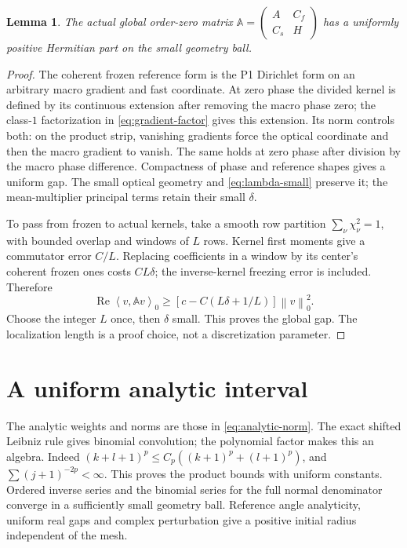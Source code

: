 \documentclass[11pt,a4paper]{article}
\numberwithin{equation}{section}
\newtheorem{lemma}[theorem]{Lemma}
\theoremstyle{remark}
\newcommand{\norm}[1]{\left\lVert #1\right\rVert}
\newcommand{\ip}[2]{\left\langle #1,#2\right\rangle_0}
\begin{document}
\begin{lemma}\label{lem:global-gap}
The actual global order-zero matrix
\(\mathbb A=\left(\begin{smallmatrix}A&C_f\\C_s&H\end{smallmatrix}\right)\)
has a uniformly positive Hermitian part on the small geometry ball.
\end{lemma}
\begin{proof}
The coherent frozen reference form is the P1 Dirichlet form on an
arbitrary macro gradient and fast coordinate. At zero phase the divided
kernel is defined by its continuous extension after removing the macro
phase zero; the class-\(1\) factorization in
\eqref{eq:gradient-factor} gives this extension. Its norm controls both:
on the product strip, vanishing gradients force the optical
coordinate and then the macro gradient to vanish. The same holds
at zero phase after division by the macro phase difference.
Compactness of phase and reference shapes gives a uniform gap.
The small optical geometry and \eqref{eq:lambda-small} preserve it;
the mean-multiplier principal terms retain their small \(\delta\).

To pass from frozen to actual kernels, take a smooth row partition
\(\sum_\nu\chi_\nu^2=1\), with bounded overlap and windows of \(L\)
rows. Kernel first moments give a commutator error \(C/L\).
Replacing coefficients in a window by its center's coherent frozen
ones costs \(CL\delta\); the inverse-kernel freezing error is
included. Therefore
\[
 \operatorname{Re}\ip v{\mathbb Av}
       \geq [c-C(L\delta+1/L)]\norm v_0^2 .
\]
Choose the integer \(L\) once, then \(\delta\) small. This proves
the global gap. The localization length is a proof choice, not
a discretization parameter.
\end{proof}

\section{A uniform analytic interval}\label{sec:interval}

The analytic weights and norms are those in \eqref{eq:analytic-norm}. The exact shifted Leibniz rule gives binomial convolution;
the polynomial factor makes this an algebra. Indeed
\((k+l+1)^p\leq C_p((k+1)^p+(l+1)^p)\), and
\(\sum(j+1)^{-2p}<\infty\). This proves the product bounds with
uniform constants. Ordered inverse series and the binomial series
for the full normal denominator converge in a sufficiently small
geometry ball. Reference angle analyticity, uniform real gaps and
complex perturbation give a positive initial radius independent
of the mesh.
\end{document}
